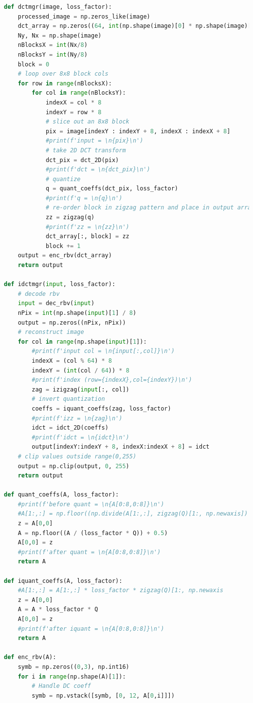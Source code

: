\documentclass[11pt,a4paper]{article}
\begin{document}
\begin{lstlisting}[language=python]
def dctmgr(image, loss_factor):
    processed_image = np.zeros_like(image)
    dct_array = np.zeros((64, int(np.shape(image)[0] * np.shape(image)[1] / 64)))
    Ny, Nx = np.shape(image)
    nBlocksX = int(Nx/8)
    nBlocksY = int(Ny/8)
    block = 0
    # loop over 8x8 block cols
    for row in range(nBlocksX):
        for col in range(nBlocksY):
            indexX = col * 8
            indexY = row * 8
            # slice out an 8x8 block
            pix = image[indexY : indexY + 8, indexX : indexX + 8]
            #print(f'input = \n{pix}\n')
            # take 2D DCT transform
            dct_pix = dct_2D(pix)
            #print(f'dct = \n{dct_pix}\n')
            # quantize
            q = quant_coeffs(dct_pix, loss_factor)
            #print(f'q = \n{q}\n')
            # re-order block in zigzag pattern and place in output array
            zz = zigzag(q)
            #print(f'zz = \n{zz}\n')
            dct_array[:, block] = zz
            block += 1
    output = enc_rbv(dct_array)
    return output

def idctmgr(input, loss_factor):
    # decode rbv
    input = dec_rbv(input)
    nPix = int(np.shape(input)[1] / 8)
    output = np.zeros((nPix, nPix))
    # reconstruct image
    for col in range(np.shape(input)[1]):
        #print(f'input col = \n{input[:,col]}\n')
        indexX = (col % 64) * 8
        indexY = (int(col / 64)) * 8
        #print(f'index (row={indexX},col={indexY})\n')
        zag = izigzag(input[:, col])
        # invert quantization
        coeffs = iquant_coeffs(zag, loss_factor)
        #print(f'izz = \n{zag}\n')
        idct = idct_2D(coeffs)
        #print(f'idct = \n{idct}\n')
        output[indexY:indexY + 8, indexX:indexX + 8] = idct
    # clip values outside range(0,255)
    output = np.clip(output, 0, 255)
    return output

def quant_coeffs(A, loss_factor):
    #print(f'before quant = \n{A[0:8,0:8]}\n')
    #A[1:,:] = np.floor((np.divide(A[1:,:], zigzag(Q)[1:, np.newaxis]) / loss_factor) + 0.5)
    z = A[0,0]
    A = np.floor((A / (loss_factor * Q)) + 0.5)
    A[0,0] = z
    #print(f'after quant = \n{A[0:8,0:8]}\n')
    return A

def iquant_coeffs(A, loss_factor):
    #A[1:,:] = A[1:,:] * loss_factor * zigzag(Q)[1:, np.newaxis
    z = A[0,0]
    A = A * loss_factor * Q
    A[0,0] = z
    #print(f'after iquant = \n{A[0:8,0:8]}\n')
    return A

def enc_rbv(A):
    symb = np.zeros((0,3), np.int16)
    for i in range(np.shape(A)[1]):
        # Handle DC coeff
        symb = np.vstack([symb, [0, 12, A[0,i]]])


\end{lstlisting}
\end{document}
